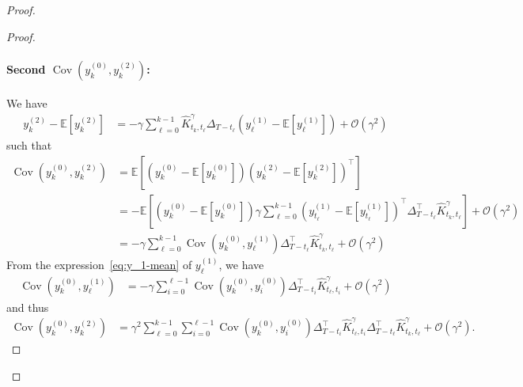 \documentclass[11pt]{article}
\newcommand{\EE}{\mathbb{E}}
\newcommand{\cov}{\operatorname{Cov}}
\begin{document}
\begin{proof}
\begin{proof}
\paragraph{Second $\cov(y^{(0)}_k, y^{(2)}_k)$:}
We have
\begin{align*} 
y^{(2)}_k - \EE[y^{(2)}_k] &= - \gamma \sum_{\ell=0}^{k-1} \hat K^\gamma _{t_k,t_\ell} \Delta_{T-t_\ell} \left(y^{(1)}_\ell - \EE[y^{(1)}_\ell] \right) + \mathcal{O}(\gamma^2)
\end{align*}
such that
\begin{align*}
\cov(y^{(0)}_k, y^{(2)}_k) &= \EE\left[(y^{(0)}_k- \EE[y^{(0)}_k])(y^{(2)}_k- \EE[y^{(2)}_k])^\top \right]  \\
&= - \EE\left[ \left(y^{(0)}_k - \EE[y^{(0)}_k] \right) \gamma \sum_{\ell=0}^{k-1} \left(y^{(1)}_{t_\ell} - \EE[y^{(1)}_{t_\ell}] \right)^\top \Delta_{T-t_\ell}^\top  \hat K^\gamma_{t_k,t_\ell}  \right] + \mathcal{O}(\gamma^2) \\
&=  - \gamma \sum_{\ell=0}^{k-1} \cov(y^{(0)}_k, y^{(1)}_\ell)  \Delta_{T-t_\ell}^\top  \hat K^\gamma_{t_k,t_\ell} + \mathcal{O}(\gamma^2)
\end{align*}
From the expression~\eqref{eq:y_1-mean} of $y^{(1)}_\ell$, we have 
\begin{align*}
\cov(y^{(0)}_k, y^{(1)}_\ell) &=  - \gamma \sum_{i=0}^{\ell-1}  \cov(y^{(0)}_k, y^{(0)}_i) \Delta_{T-t_i}^\top \hat K^\gamma_{t_\ell,t_i} + \mathcal{O}(\gamma^2)
\end{align*}
and thus
\begin{align*}
\cov(y^{(0)}_k, y^{(2)}_k) &= \gamma^2 \sum_{\ell=0}^{k-1} \sum_{i=0}^{\ell-1}\cov(y^{(0)}_k, y^{(0)}_i)  \Delta_{T-t_i}^\top \hat K^\gamma_{t_\ell,t_i} \Delta_{T-t_\ell}^\top \hat K^\gamma_{t_k,t_\ell} + \mathcal{O}(\gamma^2).
\end{align*}

\end{proof}
\end{proof}
\end{document}
